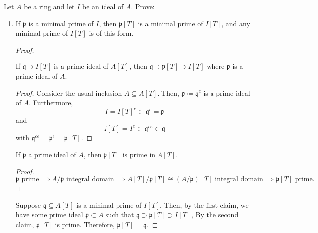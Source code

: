 \begin{problem}
    Let $A$ be a ring and let $I$ be an ideal of $A$.
    Prove:
    \begin{enumerate}[label=(\theproblem.\arabic*),ref=\theproblem.\arabic*]

        \item If $\mathfrak{p}$ is a minimal prime of $I$, then $\mathfrak{p}[T]$ is a minimal prime of $I[T]$, and any minimal prime of $I[T]$ is of this form.
        \begin{sol}

            \begin{proof}

                \begin{claim}
                    If $\mathfrak{q} \supset I[T]$ is a prime ideal of $A[T]$, then
                    $\mathfrak{q} \supset \mathfrak{p}[T] \supset I[T]$ where $\mathfrak{p}$ is a prime ideal of $A$.
                     \begin{proof}
                        Consider the usual inclusion $A \subseteq A[T]$.
                        Then,
                        $\mathfrak{p} \coloneqq \mathfrak{q}^{c}$ is a prime ideal of $A$.
                        Furthermore,
                        \[I = I[T]^c \subset \mathfrak{q}^c = \mathfrak{p}\]
                        and
                        \[I[T] = I^e \subset \mathfrak{q}^{ce} \subset \mathfrak{q}\]
                        with $\mathfrak{q}^{ce}=\mathfrak{p}^e = \mathfrak{p}[T]$.
                     \end{proof}
                \end{claim}

                \begin{claim}
                    If $\mathfrak{p}$ a prime ideal of $A$, then $\mathfrak{p}[T]$ is prime in $A[T]$.
                    \begin{proof}
                        $\mathfrak{p} \text{ prime } \Rightarrow
                        A / \mathfrak{p} \text{ integral domain }
                        \Rightarrow A[T]/\mathfrak{p}[T] \cong (A / \mathfrak{p})[T] \text{ integral domain }
                        \Rightarrow \mathfrak{p}[T] \text{ prime.}$
                    \end{proof}
                \end{claim}



                Suppose $\mathfrak{q} \subseteq A[T]$ is a minimal prime of $I[T]$.
                Then, by the first claim, we have some prime ideal $\mathfrak{p} \subset A$ such that
                $\mathfrak{q} \supset \mathfrak{p}[T] \supset I[T]$,
                By the second claim, $\mathfrak{p}[T]$ is prime.
                Therefore, $\mathfrak{p}[T] = \mathfrak{q}$.


\end{proof}
\end{sol}
\end{enumerate}
\end{problem}
